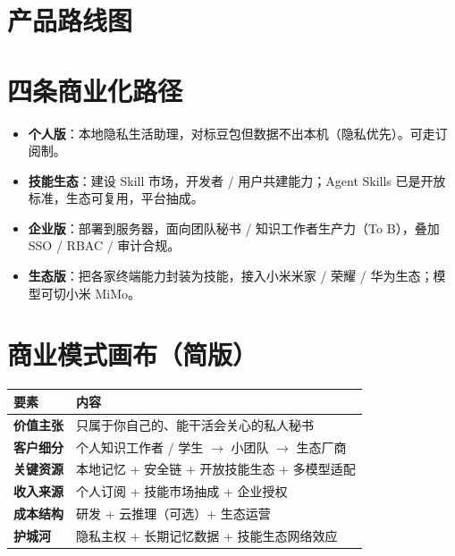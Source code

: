 \section{产品路线图}
\begin{center}
\end{center}

\section{四条商业化路径}
\begin{itemize}[leftmargin=1.4em]
  \item \textbf{个人版}：本地隐私生活助理，对标豆包但数据不出本机（隐私优先）。可走订阅制。
  \item \textbf{技能生态}：建设 Skill 市场，开发者 / 用户共建能力；Agent Skills 已是开放标准，生态可复用，平台抽成。
  \item \textbf{企业版}：部署到服务器，面向团队秘书 / 知识工作者生产力（To B），叠加 SSO / RBAC / 审计合规。
  \item \textbf{生态版}：把各家终端能力封装为技能，接入小米米家 / 荣耀 / 华为生态；模型可切小米 MiMo。
\end{itemize}

\section{商业模式画布（简版）}
\begin{center}
\small
\begin{tabularx}{\linewidth}{>{\bfseries}p{2.8cm} X}
\toprule
要素 & 内容 \\
\midrule
价值主张 & 只属于你自己的、能干活会关心的私人秘书 \\
客户细分 & 个人知识工作者 / 学生 $\to$ 小团队 $\to$ 生态厂商 \\
关键资源 & 本地记忆 + 安全链 + 开放技能生态 + 多模型适配 \\
收入来源 & 个人订阅 + 技能市场抽成 + 企业授权 \\
成本结构 & 研发 + 云推理（可选）+ 生态运营 \\
护城河 & 隐私主权 + 长期记忆数据 + 技能生态网络效应 \\
\bottomrule
\end{tabularx}
\end{center}

